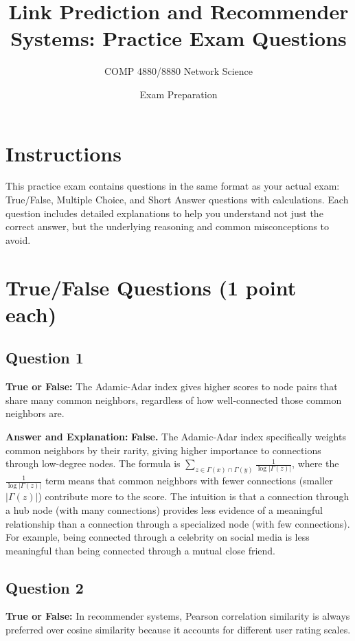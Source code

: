 \documentclass[11pt]{article}
\title{Link Prediction and Recommender Systems: Practice Exam Questions}
\author{COMP 4880/8880 Network Science}
\date{Exam Preparation}
\newenvironment{answer}{\color{answercolor}\begin{framed}\textbf{Answer and Explanation:}}{\end{framed}}
\begin{document}
\maketitle

\section*{Instructions}
This practice exam contains questions in the same format as your actual exam: True/False, Multiple Choice, and Short Answer questions with calculations. Each question includes detailed explanations to help you understand not just the correct answer, but the underlying reasoning and common misconceptions to avoid.

\section{True/False Questions (1 point each)}

\subsection{Question 1}
\textbf{True or False:} The Adamic-Adar index gives higher scores to node pairs that share many common neighbors, regardless of how well-connected those common neighbors are.

\begin{answer}
\textbf{False.} The Adamic-Adar index specifically weights common neighbors by their rarity, giving higher importance to connections through low-degree nodes. The formula is $\sum_{z \in \Gamma(x) \cap \Gamma(y)} \frac{1}{\log|\Gamma(z)|}$, where the $\frac{1}{\log|\Gamma(z)|}$ term means that common neighbors with fewer connections (smaller $|\Gamma(z)|$) contribute more to the score. The intuition is that a connection through a hub node (with many connections) provides less evidence of a meaningful relationship than a connection through a specialized node (with few connections). For example, being connected through a celebrity on social media is less meaningful than being connected through a mutual close friend.
\end{answer}

\subsection{Question 2}
\textbf{True or False:} In recommender systems, Pearson correlation similarity is always preferred over cosine similarity because it accounts for different user rating scales.
\end{document}
